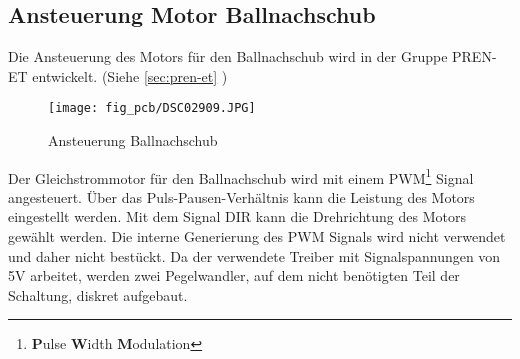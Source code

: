 \subsection{Ansteuerung Motor Ballnachschub}
\label{sec:dc}
Die Ansteuerung des Motors für den Ballnachschub wird in der Gruppe 
PREN-ET entwickelt. (Siehe \ref{sec:pren-et} )
\begin{figure}[h!]
    \centering
    \texttt{[image: fig\_pcb/DSC02909.JPG]}
    \caption{Ansteuerung Ballnachschub}
    \label{fig:dc}
\end{figure}

\noindent
Der Gleichstrommotor für den Ballnachschub wird mit einem 
PWM\footnote{\textbf{P}ulse \textbf{W}idth \textbf{M}odulation} Signal 
angesteuert. Über das Puls-Pausen-Verhältnis kann die Leistung des Motors 
eingestellt werden. Mit dem Signal DIR kann die Drehrichtung des Motors 
gewählt werden. Die interne Generierung des PWM Signals wird nicht verwendet 
und daher nicht bestückt. Da der verwendete Treiber mit Signalspannungen von 
5\si{\volt} arbeitet, werden zwei Pegelwandler, auf dem nicht benötigten Teil 
der Schaltung, diskret aufgebaut. 
